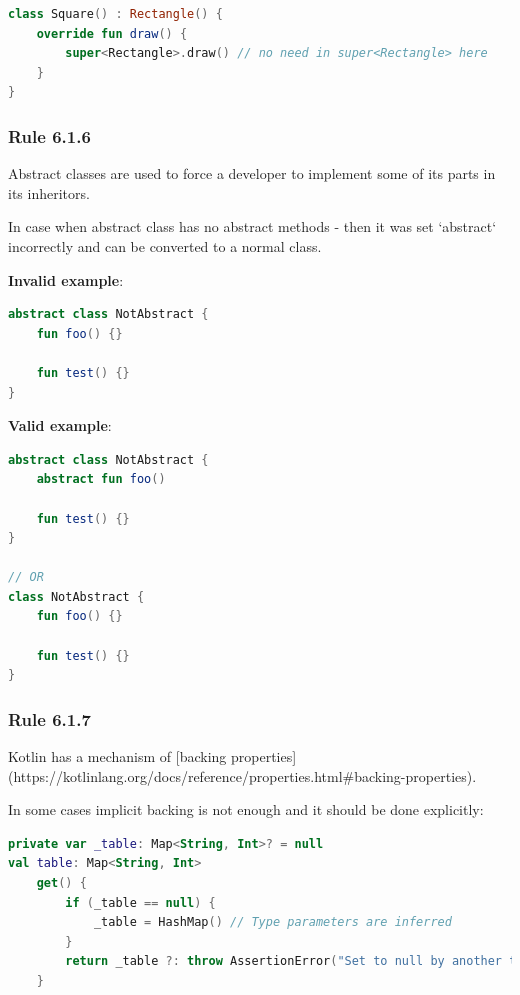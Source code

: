 {{{{\begin{lstlisting}[language=Kotlin]
class Square() : Rectangle() {
    override fun draw() {
        super<Rectangle>.draw() // no need in super<Rectangle> here
    }
}
\end{lstlisting}


\subsubsection*{\textbf{Rule 6.1.6}}
\leavevmode\newline

Abstract classes are used to force a developer to implement some of its parts in its inheritors.

In case when abstract class has no abstract methods - then it was set `abstract` incorrectly and can be converted to a normal class.



\textbf{Invalid example}:

\begin{lstlisting}[language=Kotlin]
abstract class NotAbstract {
    fun foo() {}

    fun test() {}
}
\end{lstlisting}


\textbf{Valid example}:

\begin{lstlisting}[language=Kotlin]
abstract class NotAbstract {
    abstract fun foo()

    fun test() {}
}

// OR
class NotAbstract {
    fun foo() {}

    fun test() {}
}
\end{lstlisting}




\subsubsection*{\textbf{Rule 6.1.7}}
\leavevmode\newline

Kotlin has a mechanism of [backing properties](https://kotlinlang.org/docs/reference/properties.html\#backing-properties).

In some cases implicit backing is not enough and it should be done explicitly:

\begin{lstlisting}[language=Kotlin]
private var _table: Map<String, Int>? = null
val table: Map<String, Int>
    get() {
        if (_table == null) {
            _table = HashMap() // Type parameters are inferred
        }
        return _table ?: throw AssertionError("Set to null by another thread")
    }
\end{lstlisting}


}}}}
